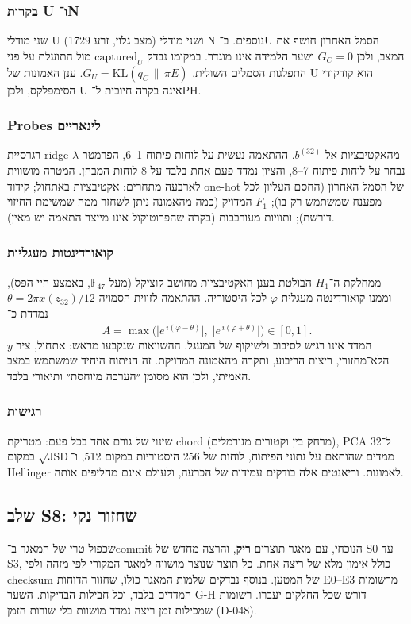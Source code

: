 \documentclass[12pt,a4paper]{article}
\newcommand{\en}[1]{\foreignlanguage{english}{#1}}   %
\newcommand{\bel}[1]{b^{(#1)}}
\newcommand{\GC}{G_{C}}
\newcommand{\KL}{\mathrm{KL}}
\begin{document}
\subsubsection{בקרות U ו־N}
שני מודלי U (מצב גלוי, זרע 1729) ושני מודלי N נוספים. ב־U הסמל האחרון חושף את המצב, ולכן $\GC=0$ ושער הלמידה אינו מוגדר. במקומו נבדק $\mathrm{captured}_U$ מול התועלת על פני התפלגות הסמלים השולית, $G_U=\KL(q_C\,\|\,\pi E)$. ענן האמונות של U הוא קודקודי הסימפלקס, ולכן U אינה בקרה חיובית ל־PH.

\subsubsection{\en{Probes} לינאריים}
רגרסיית \en{ridge} מהאקטיבציות אל $\bel{32}$. ההתאמה נעשית על לוחות פיתוח 1–6, הפרמטר $\lambda$ נבחר על לוחות פיתוח 7–8, והציון נמדד פעם אחת בלבד על 8 לוחות המבחן. המטרה מושווית לארבעה מתחרים: אקטיבציות באתחול; קידוד \en{one-hot} של הסמל האחרון (החסם העליון לכל מפענח שמשתמש רק בו); $F_1$ המדויק (כמה מהאמונה ניתן לשחזר ממה שמשימת החיזוי דורשת); ותוויות מעורבבות (בקרה שהפרוטוקול אינו מייצר התאמה יש מאין).

\subsubsection{קואורדינטות מעגליות}
ממחלקת ה־$H_1$ הבולטת בענן האקטיבציות מחושב קוציקל (מעל $\mathbb{F}_{47}$, באמצע חיי הפס), וממנו קואורדינטה מעגלית $\varphi$ לכל היסטוריה. ההתאמה לזווית הסמויה $\theta=2\pi x(z_{32})/12$ נמדדת כ־
\begin{equation}
A=\max\Big(\big|\overline{e^{\,i(\varphi-\theta)}}\big|,\;\big|\overline{e^{\,i(\varphi+\theta)}}\big|\Big)\in[0,1].
\end{equation}
המדד אינו רגיש לסיבוב ולשיקוף של המעגל. ההשוואות שנקבעו מראש: אתחול, ציר $y$ הלא־מחזורי, ריצות הריבוע, ותקרה מהאמונה המדויקת. זה הניתוח היחיד שמשתמש במצב האמיתי, ולכן הוא מסומן ״הערכה מיוחסת״ ותיאורי בלבד.

\subsubsection{רגישות}
שינוי של גורם אחד בכל פעם: מטריקת \en{chord} (מרחק בין וקטורים מנורמלים), \en{PCA} ל־32 ממדים שהותאם על נתוני הפיתוח, לוחות של 256 היסטוריות במקום 512, ו־$\sqrt{\mathrm{JSD}}$ במקום \en{Hellinger} לאמונות. וריאנטים אלה בודקים עמידות של הכרעה, ולעולם אינם מחליפים אותה.

\subsection{שלב S8: שחזור נקי}
שכפול טרי של המאגר ב־\en{commit} הנוכחי, עם מאגר תוצרים \textbf{ריק}, והרצה מחדש של S0 עד S3, כולל אימון מלא של ריצה אחת. כל תוצר שנוצר מושווה למאגר המקורי לפי מזהה ולפי \en{checksum} של המטען. בנוסף נבדקים שלמות המאגר כולו, שחזור הדוחות \en{E0--E3} מרשומות המדדים בלבד, וכל חבילות הבדיקות. השער \en{G-H} דורש שכל החלקים יעברו. רשומות שמכילות זמן ריצה נמדד מושוות בלי שורות הזמן (\en{D-048}).
\end{document}
